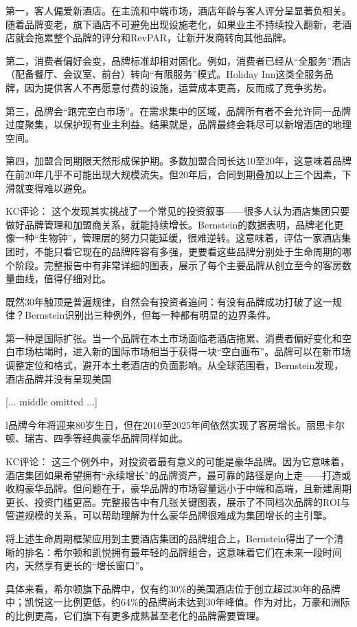 \documentclass[11pt]{ctexart}
\begin{document}
第一，客人偏爱新酒店。在主流和中端市场，酒店年龄与客人评分呈显著负相关。随着品牌变老，旗下酒店不可避免出现设施老化，如果业主不持续投入翻新，老酒店就会拖累整个品牌的评分和RevPAR，让新开发商转向其他品牌。

第二，消费者偏好会变，品牌标准却相对固化。例如，消费者已经从“全服务”酒店（配备餐厅、会议室、前台）转向“有限服务”模式。Holiday Inn这类全服务品牌，因为提供客人不再愿意付费的设施，运营成本更高，反而成了竞争劣势。

第三，品牌会“跑完空白市场”。在需求集中的区域，品牌所有者不会允许同一品牌过度聚集，以保护现有业主利益。结果就是，品牌最终会耗尽可以新增酒店的地理空间。

第四，加盟合同期限天然形成保护期。多数加盟合同长达10至20年，这意味着品牌在前20年几乎不可能出现大规模流失。但20年后，合同到期叠加以上三个因素，下滑就变得难以避免。

KC评论： 这个发现其实挑战了一个常见的投资叙事——很多人认为酒店集团只要做好品牌管理和加盟商关系，就能持续增长。Bernstein的数据表明，品牌老化更像一种“生物钟”，管理层的努力只能延缓，很难逆转。这意味着，评估一家酒店集团时，不能只看它现在的品牌阵容有多强，更要看这些品牌分别处于生命周期的哪个阶段。完整报告中有非常详细的图表，展示了每个主要品牌从创立至今的客房数量曲线，值得仔细对比。

既然30年触顶是普遍规律，自然会有投资者追问：有没有品牌成功打破了这一规律？Bernstein识别出三种例外，但每一种都有明显的边界条件。

第一种是国际扩张。当一个品牌在本土市场面临老酒店拖累、消费者偏好变化和空白市场枯竭时，进入新的国际市场相当于获得一块“空白画布”。品牌可以在新市场调整定位和格式，避开本土老酒店的负面影响。从全球范围看，Bernstein发现，酒店品牌并没有呈现美国

[... middle omitted ...]

l品牌今年将迎来80岁生日，但在2010至2025年间依然实现了客房增长。丽思卡尔顿、瑞吉、四季等经典豪华品牌同样如此。

KC评论： 这三个例外中，对投资者最有意义的可能是豪华品牌。因为它意味着，酒店集团如果希望拥有“永续增长”的品牌资产，最可靠的路径是向上走——打造或收购豪华品牌。但问题在于，豪华品牌的市场容量远小于中端和高端，且新建周期更长、投资门槛更高。完整报告中有几张关键图表，展示了不同档次品牌的ROI与管道规模的关系，可以帮助理解为什么豪华品牌很难成为集团增长的主引擎。

将上述生命周期框架应用到主要酒店集团的品牌组合上，Bernstein得出了一个清晰的排名：希尔顿和凯悦拥有最年轻的品牌组合，这意味着它们在未来一段时间内，天然享有更长的“增长窗口”。

具体来看，希尔顿旗下品牌中，仅有约30\%的美国酒店位于创立超过30年的品牌中；凯悦这一比例更低，约64\%的品牌尚未达到30年峰值。作为对比，万豪和洲际的比例更高，它们旗下有更多成熟甚至老化的品牌需要管理。
\end{document}
